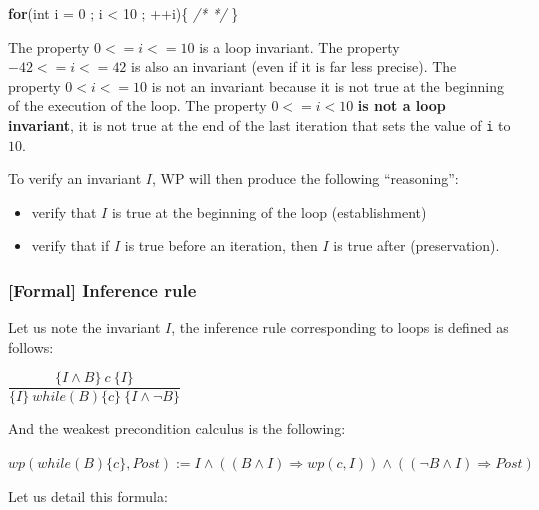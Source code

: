 \documentclass[12pt,francais,]{scrbook}
\newenvironment{Shaded}{}{}
\newcommand{\KeywordTok}[1]{\textcolor[rgb]{0.00,0.44,0.13}{\textbf{{#1}}}}
\newcommand{\DataTypeTok}[1]{\textcolor[rgb]{0.56,0.13,0.00}{{#1}}}
\newcommand{\DecValTok}[1]{\textcolor[rgb]{0.25,0.63,0.44}{{#1}}}
\newcommand{\CommentTok}[1]{\textcolor[rgb]{0.38,0.63,0.69}{\textit{{#1}}}}
\newcommand{\NormalTok}[1]{{#1}}
\providecommand{\tightlist}{%
  \setlength{\itemsep}{0pt}\setlength{\parskip}{0pt}}
\begin{document}
\begin{footnotesize}\begin{Shaded}
\begin{Highlighting}[]
\KeywordTok{for}\NormalTok{(}\DataTypeTok{int} \NormalTok{i = }\DecValTok{0} \NormalTok{; i < }\DecValTok{10} \NormalTok{; ++i)\{ }\CommentTok{/* */} \NormalTok{\}}
\end{Highlighting}
\end{Shaded}\end{footnotesize}

The property \(0 <= i <= 10\) is a loop invariant. The property
\(-42 <= i <= 42\) is also an invariant (even if it is far less
precise). The property \(0 < i <= 10\) is not an invariant because it is
not true at the beginning of the execution of the loop. The property
\(0 <= i < 10\) \textbf{is not a loop invariant}, it is not true at the
end of the last iteration that sets the value of \texttt{i} to \(10\).

To verify an invariant \(I\), WP will then produce the following
``reasoning'':

\begin{itemize}
\tightlist
\item
  verify that \(I\) is true at the beginning of the loop (establishment)
\item
  verify that if \(I\) is true before an iteration, then \(I\) is true
  after (preservation).
\end{itemize}

\subsubsection{{[}Formal{]} Inference rule}\label{formal-inference-rule}

Let us note the invariant \(I\), the inference rule corresponding to
loops is defined as follows:

\begin{center}
\(\dfrac{\{I \wedge B \}\ c\ \{I\}}{\{I\}\ while(B)\{c\}\ \{I \wedge \neg B\}}\)
\end{center}

And the weakest precondition calculus is the following:

\begin{center}
\(wp(while (B) \{ c \}, Post) := I \wedge ((B \wedge I) \Rightarrow wp(c, I)) \wedge ((\neg B \wedge I) \Rightarrow Post)\)
\end{center}

Let us detail this formula:
\end{document}
